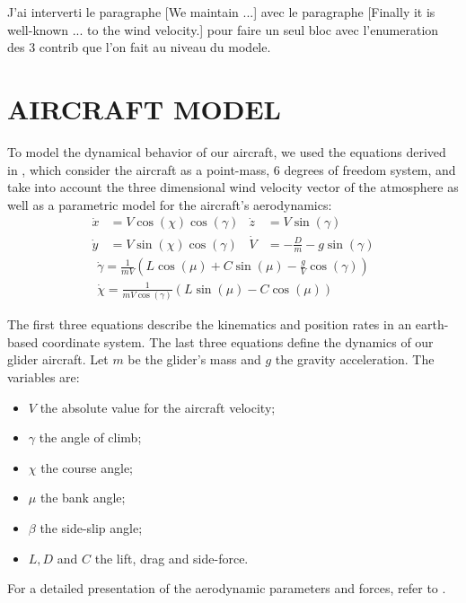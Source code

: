\documentclass[a4paper, 10pt, conference]{ieeeconf}
\begin{document}
{\color{red}J'ai interverti le paragraphe [We maintain ...] avec le paragraphe [Finally it is well-known ... to the wind velocity.] pour faire un seul bloc avec l'enumeration des 3 contrib que l'on fait au niveau du modele.}

\section{AIRCRAFT MODEL}
\label{sec:aircraft}

To model the dynamical behavior of our aircraft, we used the equations derived in \cite{dynamic}, which consider the aircraft as a point-mass, 6 degrees of freedom system, and take into account the three dimensional wind velocity vector of the atmosphere as well as a parametric model for the aircraft's aerodynamics:
\begin{align*}
\dot{x} &= V \cos(\chi)\cos(\gamma) & \dot{z} &= V \sin(\gamma)\\
\dot{y} &= V \sin(\chi)\cos(\gamma) & \dot{V} &= -\frac{D}{m}-g \sin(\gamma)
\end{align*}
\begin{gather*}
\dot{\gamma}  = \frac{1}{mV}\left(L\cos(\mu) + C \sin(\mu) - \frac{g}{V}\cos(\gamma)\right) \\
\dot{\chi} = \frac{1}{mV \cos(\gamma)}\left(L\sin\left(\mu\right)-C \cos\left(\mu\right)\right)
\end{gather*}


The first three equations describe the kinematics and position rates in an earth-based coordinate system. The last three equations define the dynamics of our glider aircraft. Let $m$ be the glider's mass and $g$ the gravity acceleration. The variables are:
\begin{itemize}
\item $V$ the absolute value for the aircraft velocity;
\item $\gamma$ the angle of climb;
\item $\chi$ the course angle;
\item $\mu$ the bank angle;
\item $\beta$ the side-slip angle;
\item $L, D $ and $C$ the lift, drag and side-force.
\end{itemize}

For a detailed presentation of the aerodynamic parameters and forces, refer to \cite{dynamic}.
\end{document}
